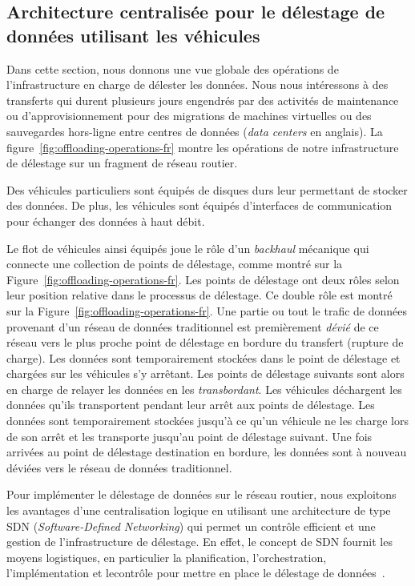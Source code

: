 \subsection{Architecture centralisée pour le délestage de données utilisant les véhicules} 
 
Dans cette section, nous donnons une vue globale des opérations de l’infrastructure en charge de délester les données. Nous nous intéressons à des transferts qui durent plusieurs jours engendrés par des activités de maintenance ou d’approvisionnement pour des migrations de machines virtuelles ou des sauvegardes hors-ligne entre centres de données (\textit{data centers} en anglais). La figure~\ref{fig:offloading-operations-fr} montre les opérations de notre infrastructure de délestage sur un fragment de réseau routier. 

Des véhicules particuliers sont équipés de disques durs leur permettant de stocker des données. De plus, les véhicules sont équipés d’interfaces de communication pour échanger des données à haut débit. 

Le flot de véhicules ainsi équipés joue le rôle d’un \textit{backhaul} mécanique qui connecte une collection de points de délestage, comme montré sur la Figure~\ref{fig:offloading-operations-fr}. Les points de délestage ont deux rôles selon leur position relative dans le processus de délestage. Ce double rôle est montré sur la Figure~\ref{fig:offloading-operations-fr}. Une partie ou tout le trafic de données provenant d’un réseau de données traditionnel est premièrement \textit{dévié} de ce réseau vers le plus proche point de délestage en bordure du transfert (rupture de charge). Les données sont temporairement stockées dans le point de délestage et chargées sur les véhicules s’y arrêtant. Les points de délestage suivants sont alors en charge de relayer les données en les \textit{transbordant}. Les véhicules déchargent les données qu’ils transportent pendant leur arrêt aux points de délestage. Les données sont temporairement stockées jusqu’à ce qu’un véhicule ne les charge lors de son arrêt et les transporte jusqu’au point de délestage suivant. Une fois arrivées au point de délestage destination en bordure, les données sont à nouveau déviées vers le réseau de données traditionnel. 
 
 
Pour implémenter le délestage de données sur le réseau routier, nous exploitons les avantages d’une centralisation logique en utilisant une architecture de type SDN (\textit{Software-Defined Networking}) qui permet un contrôle efficient et une gestion de l’infrastructure de délestage. En effet, le concept de SDN fournit les moyens logistiques, en particulier la planification, l’orchestration, l'implémentation et lecontrôle pour mettre en place le délestage de données~\cite{mckeown2008openflow}. 
 
